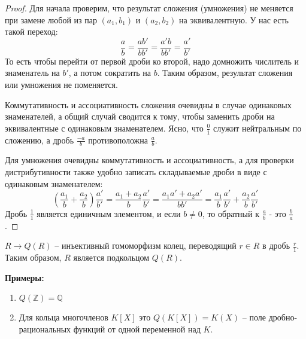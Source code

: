 \begin{proof}
    Для начала проверим, что результат сложения (умножения) не меняется при замене любой из пар $(a_1, b_1)$ и $(a_2, b_2)$ на эквивалентную.
    У нас есть такой переход:
    \[ \frac{a}{b} = \frac{ab'}{bb'} = \frac{a'b}{bb'} = \frac{a'}{b'} \]
    То есть чтобы перейти от первой дроби ко второй, надо домножить числитель и знаменатель на $b'$, а потом сократить на $b$. Таким образом, результат сложения или умножения не поменяется.
    
    Коммутативность и ассоциативность сложения очевидны в случае одинаковых знаменателей, а общий случай сводится к тому, чтобы заменить дроби на эквивалентные с одинаковым знаменателем.
    Ясно, что $\frac{0}{1}$ служит нейтральным по сложению, а дробь $\frac{-a}{b}$ противоположна $\frac{a}{b}$.
    
    Для умножения очевидны коммутативность и ассоциативность, 
    а для проверки дистрибутивности также удобно записать складываемые дроби в виде с одинаковым знаменателем:
    \[ (\frac{a_1}{b} + \frac{a_2}{b})\frac{a'}{b'} = \frac{a_1 + a_2}{b}\frac{a'}{b'} 
    = \frac{a_1a' + a_2a'}{bb'} = \frac{a_1}{b}\frac{a'}{b'} + \frac{a_2}{b}\frac{a'}{b'} \]
    Дробь $\frac{1}{1}$ является единичным элементом, и если $b \neq 0$, то обратный к $\frac{a}{b}$ - это $\frac{b}{a}$.
\end{proof}

\begin{notice}
    $R \to Q(R)$ -- инъективный гомоморфизм колец, переводящий $r \in R$ в дробь $\frac{r}{1}$. Таким образом, $R$ является подкольцом $Q(R)$.
\end{notice}

\textbf{Примеры:}
\begin{enumerate}
    \item $Q(\mathbb{Z}) = \mathbb{Q}$
    \item Для кольца многочленов $K[X]$ это $Q(K[X]) = K(X)$ -- поле дробно-рациональных функций от одной переменной над $K$.
\end{enumerate}
